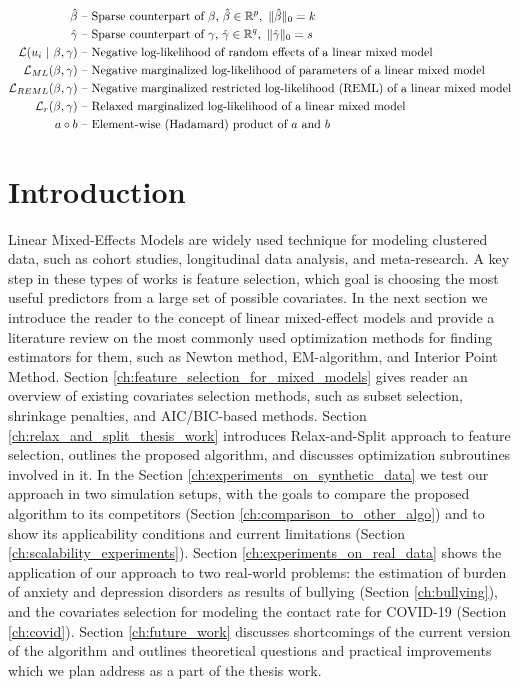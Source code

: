 \documentclass[11pt,letterpaper]{article}
\numberwithin{equation}{section} %
\numberwithin{figure}{section} %
\numberwithin{table}{section} %
\begin{document}
\begin{center}
\begin{equation}
\begin{split}
			\hat\beta & \text{ -- Sparse counterpart of $\beta$, } \hat\beta \in \operatorname{\mathbb{R}}^p, \ \|\hat\beta\|_0 = k \\
			\hat\gamma & \text{ -- Sparse counterpart of $\gamma$, } \hat\gamma \in \operatorname{\mathbb{R}}^q, \ \|\hat\gamma\|_0 = s \\
			\operatorname{\mathcal{L}}(u_i\ |\ \beta, \gamma) & \text{ -- Negative log-likelihood of random effects of a linear mixed model}\\
			\operatorname{\mathcal{L}}_{ML}(\beta, \gamma) & \text{ -- Negative marginalized log-likelihood of parameters of a linear mixed model} \\
			\operatorname{\mathcal{L}}_{REML}(\beta, \gamma) & \text{ -- Negative marginalized restricted log-likelihood (REML) of a linear mixed model}\\
			\operatorname{\mathcal{L}}_{r}(\beta, \gamma) & \text{ -- Relaxed marginalized log-likelihood of a linear mixed model} \\
			a \circ b & \text{ -- Element-wise (Hadamard) product of $a$ and $b$} \\
		\end{split}
	\end{equation}
\end{center}

\newpage

\section{Introduction}
Linear Mixed-Effects Models are widely used technique for modeling clustered data, such as cohort studies, longitudinal data analysis, and meta-research. A key step in these types of works is feature selection, which goal is choosing the most useful predictors from a large set of possible covariates. In the next section we introduce the reader to the concept of linear mixed-effect models and provide a literature review on the most commonly used optimization methods for finding estimators for them, such as Newton method, EM-algorithm, and Interior Point Method. Section \ref{ch:feature_selection_for_mixed_models} gives reader an overview of existing covariates selection methods, such as subset selection, shrinkage penalties, and AIC/BIC-based methods. Section \ref{ch:relax_and_split_thesis_work} introduces Relax-and-Split approach to feature selection, outlines the proposed algorithm, and discusses optimization subroutines involved in it. In the Section \ref{ch:experiments_on_synthetic_data} we test our approach in two simulation setups, with the goals to compare the proposed algorithm to its competitors (Section \ref{ch:comparison_to_other_algo}) and to show its applicability conditions and current limitations (Section \ref{ch:scalability_experiments}). Section \ref{ch:experiments_on_real_data} shows the application of our approach to two real-world problems: the estimation of burden of anxiety and depression disorders as results of bullying (Section \ref{ch:bullying}), and the covariates selection for modeling the contact rate for COVID-19 (Section \ref{ch:covid}). Section \ref{ch:future_work} discusses shortcomings of the current version of the algorithm and outlines theoretical questions and practical improvements which we plan address as a part of the thesis work.
 	
\end{document}
